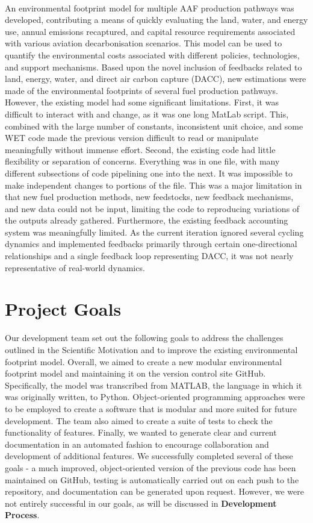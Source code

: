 \documentclass{article}
\begin{document}
\paragraph{} An environmental footprint model for multiple AAF production pathways was developed, contributing a means of quickly evaluating the land, water, and energy use, annual emissions recaptured, and capital resource requirements associated with various aviation decarbonisation scenarios. This model can be used to quantify the environmental costs associated with different policies, technologies, and support mechanisms. Based upon the novel inclusion of feedbacks related to land, energy, water, and direct air carbon capture (DACC), new estimations were made of the environmental footprints of several fuel production pathways. However, the existing model had some significant limitations. First, it was difficult to interact with and change, as it was one long MatLab script. This, combined with the large number of constants, inconsistent unit choice, and some WET code made the previous version difficult to read or manipulate meaningfully without immense effort. Second, the existing code had little flexibility or separation of concerns. Everything was in one file, with many different subsections of code pipelining one into the next. It was impossible to make independent changes to portions of the file. This was a major limitation in that new fuel production methods, new feedstocks, new feedback mechanisms, and new data could not be input, limiting the code to reproducing variations of the outputs already gathered. Furthermore, the existing feedback accounting system was meaningfully limited. As the current iteration ignored several cycling dynamics and implemented feedbacks primarily through certain one-directional relationships and a single feedback loop representing DACC, it was not nearly representative of real-world dynamics. 

\section*{Project Goals}
Our development team set out the following goals to address the challenges outlined in the Scientific Motivation and to improve the existing environmental footprint model. Overall, we aimed to create a new modular environmental footprint model and maintaining it on the version control site GitHub. Specifically, the model was transcribed from MATLAB, the language in which it was originally written, to Python. Object-oriented programming approaches were to be employed to create a software that is modular and more suited for future development. The team also aimed to create a suite of tests to check the functionality of features. Finally, we wanted to generate clear and current documentation in an automated fashion to encourage collaboration and development of additional features. We successfully completed several of these goals - a much improved, object-oriented version of the previous code has been maintained on GitHub, testing is automatically carried out on each push to the repository, and documentation can be generated upon request. However, we were not entirely successful in our goals, as will be discussed in \textbf{Development Process}. 
\end{document}
